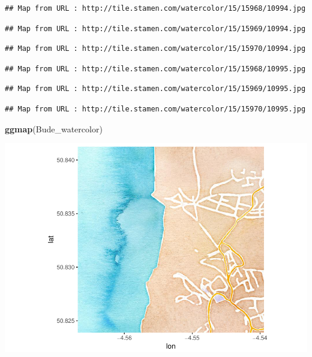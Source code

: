 \documentclass[]{article}
\newenvironment{Shaded}{\begin{snugshade}}{\end{snugshade}}
\newcommand{\KeywordTok}[1]{\textcolor[rgb]{0.13,0.29,0.53}{\textbf{#1}}}
\newcommand{\NormalTok}[1]{#1}
\begin{document}
\begin{verbatim}
## Map from URL : http://tile.stamen.com/watercolor/15/15968/10994.jpg
\end{verbatim}

\begin{verbatim}
## Map from URL : http://tile.stamen.com/watercolor/15/15969/10994.jpg
\end{verbatim}

\begin{verbatim}
## Map from URL : http://tile.stamen.com/watercolor/15/15970/10994.jpg
\end{verbatim}

\begin{verbatim}
## Map from URL : http://tile.stamen.com/watercolor/15/15968/10995.jpg
\end{verbatim}

\begin{verbatim}
## Map from URL : http://tile.stamen.com/watercolor/15/15969/10995.jpg
\end{verbatim}

\begin{verbatim}
## Map from URL : http://tile.stamen.com/watercolor/15/15970/10995.jpg
\end{verbatim}

\begin{Shaded}
\begin{Highlighting}[]
\KeywordTok{ggmap}\NormalTok{(Bude_watercolor)}
\end{Highlighting}
\end{Shaded}

\includegraphics{Bude_files/figure-latex/unnamed-chunk-6-1.pdf}
\end{document}

